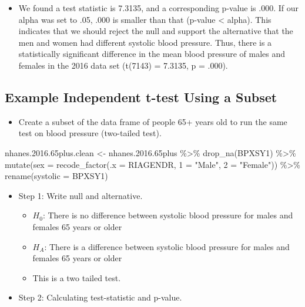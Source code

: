 \documentclass[
  letterpaper,
  DIV=11,
  numbers=noendperiod]{scrreprt}
\newenvironment{Shaded}{\begin{snugshade}}{\end{snugshade}}
\newcommand{\AttributeTok}[1]{\textcolor[rgb]{0.40,0.45,0.13}{#1}}
\newcommand{\FloatTok}[1]{\textcolor[rgb]{0.68,0.00,0.00}{#1}}
\newcommand{\FunctionTok}[1]{\textcolor[rgb]{0.28,0.35,0.67}{#1}}
\newcommand{\NormalTok}[1]{\textcolor[rgb]{0.00,0.23,0.31}{#1}}
\newcommand{\OtherTok}[1]{\textcolor[rgb]{0.00,0.23,0.31}{#1}}
\newcommand{\SpecialCharTok}[1]{\textcolor[rgb]{0.37,0.37,0.37}{#1}}
\newcommand{\StringTok}[1]{\textcolor[rgb]{0.13,0.47,0.30}{#1}}
\providecommand{\tightlist}{%
  \setlength{\itemsep}{0pt}\setlength{\parskip}{0pt}}\usepackage{longtable,booktabs,array}
\begin{document}
\begin{itemize}
  \begin{itemize}
  \tightlist
  \item
    We found a test statistic is 7.3135, and a corresponding p-value is
    .000. If our alpha was set to .05, .000 is smaller than that
    (p-value \textless{} alpha). This indicates that we should reject
    the null and support the alternative that the men and women had
    different systolic blood pressure. Thus, there is a statistically
    significant difference in the mean blood pressure of males and
    females in the 2016 data set (t(7143) = 7.3135, p = .000).
  \end{itemize}
\end{itemize}

\subsection{Example Independent t-test Using a
Subset}\label{example-independent-t-test-using-a-subset}

\begin{itemize}
\tightlist
\item
  Create a subset of the data frame of people 65+ years old to run the
  same test on blood pressure (two-tailed test).
\end{itemize}

\begin{Shaded}
\begin{Highlighting}[]
\NormalTok{nhanes.}\FloatTok{2016.65}\NormalTok{plus.clean }\OtherTok{\textless{}{-}}\NormalTok{ nhanes.}\FloatTok{2016.65}\NormalTok{plus }\SpecialCharTok{\%\textgreater{}\%}
    \FunctionTok{drop\_na}\NormalTok{(BPXSY1) }\SpecialCharTok{\%\textgreater{}\%}
    \FunctionTok{mutate}\NormalTok{(}\AttributeTok{sex =} \FunctionTok{recode\_factor}\NormalTok{(}\AttributeTok{.x =}\NormalTok{ RIAGENDR, }\StringTok{\textasciigrave{}}\AttributeTok{1}\StringTok{\textasciigrave{}} \OtherTok{=} \StringTok{"Male"}\NormalTok{, }\StringTok{\textasciigrave{}}\AttributeTok{2}\StringTok{\textasciigrave{}} \OtherTok{=} \StringTok{"Female"}\NormalTok{)) }\SpecialCharTok{\%\textgreater{}\%}
    \FunctionTok{rename}\NormalTok{(}\AttributeTok{systolic =}\NormalTok{ BPXSY1)}
\end{Highlighting}
\end{Shaded}

\begin{itemize}
\tightlist
\item
  Step 1: Write null and alternative.

  \begin{itemize}
  \tightlist
  \item
    \(H_0\): There is no difference between systolic blood pressure for
    males and females 65 years or older
  \item
    \(H_A\): There is a difference between systolic blood pressure for
    males and females 65 years or older
  \item
    This is a two tailed test.
  \end{itemize}
\item
  Step 2: Calculating test-statistic and p-value.
\end{itemize}
\end{document}
